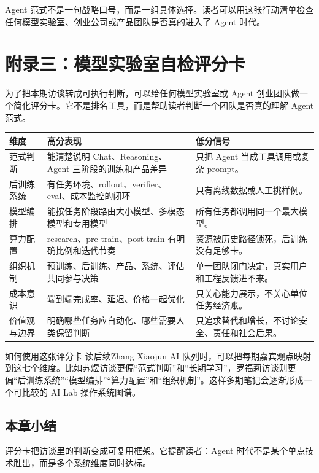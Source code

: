 \documentclass[a4paper]{article}
\begin{document}
Agent 范式不是一句战略口号，而是一组具体选择。读者可以用这张行动清单检查任何模型实验室、创业公司或产品团队是否真的进入了 Agent 时代。


\section{附录三：模型实验室自检评分卡}

为了把本期访谈转成可执行判断，可以给任何模型实验室或 Agent 创业团队做一个简化评分卡。它不是排名工具，而是帮助读者判断一个团队是否真的理解 Agent 范式。

\noindent\begin{longtable}{p{}p{}p{}}
\toprule
维度 & 高分表现 & 低分信号 \\
\midrule
范式判断 & 能清楚说明 Chat、Reasoning、Agent 三阶段的训练和产品差异 & 只把 Agent 当成工具调用或复杂 prompt。 \\
后训练系统 & 有任务环境、rollout、verifier、eval、成本监控的闭环 & 只有离线数据或人工挑样例。 \\
模型编排 & 能按任务阶段路由大小模型、多模态模型和专用模型 & 所有任务都调用同一个最大模型。 \\
算力配置 & research、pre-train、post-train 有明确比例和迭代节奏 & 资源被历史路径锁死，后训练没有足够卡。 \\
组织机制 & 预训练、后训练、产品、系统、评估共同参与决策 & 单一团队闭门决定，真实用户和工程反馈进不来。 \\
成本意识 & 端到端完成率、延迟、价格一起优化 & 只关心能力展示，不关心单位任务经济账。 \\
价值观与边界 & 明确哪些任务应自动化、哪些需要人类保留判断 & 只追求替代和增长，不讨论安全、责任和社会后果。 \\
\bottomrule
\end{longtable}

\begin{knowledgebox}{如何使用这张评分卡}
读后续Zhang Xiaojun AI 队列时，可以把每期嘉宾观点映射到这七个维度。比如苏煜访谈更偏“范式判断”和“长期学习”，罗福莉访谈则更偏“后训练系统”“模型编排”“算力配置”和“组织机制”。这样多期笔记会逐渐形成一个可比较的 AI Lab 操作系统图谱。
\end{knowledgebox}

\subsection{本章小结}

评分卡把访谈里的判断变成可复用框架。它提醒读者：Agent 时代不是某个单点技术胜出，而是多个系统维度同时达标。
\end{document}

